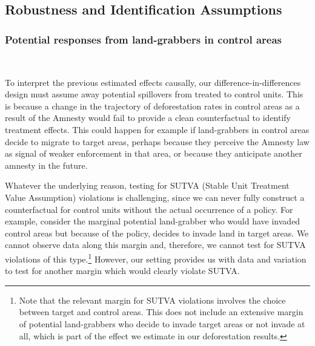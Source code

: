 \documentclass[12pt]{article}
\newcommand{\PTR}[1]{{\color{blue}{#1}}}
\begin{document}
\subsection{Robustness and Identification Assumptions} 

\PTR{One paragraph detailing each subsection briefly.}


\subsubsection{Potential responses from land-grabbers in control areas} \label{sec:5}
\ 

\quad To interpret the previous estimated effects causally, our difference-in-differences design must assume away potential spillovers from treated to control units. This is because a change in the trajectory of deforestation rates in control areas as a result of the Amnesty would fail to provide a clean counterfactual to identify treatment effects. This could happen for example if land-grabbers in control areas decide to migrate to target areas, perhaps because they perceive the Amnesty law as signal of weaker enforcement in that area, or because they anticipate another amnesty in the future.
\ 

\quad Whatever the underlying reason, testing for SUTVA (Stable Unit Treatment Value Assumption) violations is challenging, since we can never fully construct a counterfactual for control units without the actual occurrence of a policy. For example, consider the marginal potential land-grabber who would have invaded control areas but because of the policy, decides to invade land in target areas. We cannot observe data along this margin and, therefore, we cannot test for SUTVA violations of this type.\footnote{Note that the relevant margin for SUTVA violations involves the choice between target and control areas. This does not include an extensive margin of potential land-grabbers who decide to invade target areas or not invade at all, which is part of the effect we estimate in our deforestation results.} However, our setting provides us with data and variation to test for another margin which would clearly violate SUTVA. %
\ 
\end{document}
